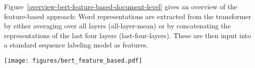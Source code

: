 \documentclass[11pt,a4paper]{article}
\begin{document}
Figure~\ref{overview-bert-feature-based-document-level} gives an overview of the feature-based approach: Word representations are extracted from the transformer by either averaging over all layers (all-layer-mean) or by concatenating the representations of the last four layers (last-four-layers). These are then input into a standard sequence labeling model as features. 

\begin{figure*}[b]
 \centering
 \texttt{[image: figures/bert\_feature\_based.pdf]}
 \label{overview-bert-feature-based-document-level}
\end{figure*}
\end{document}
